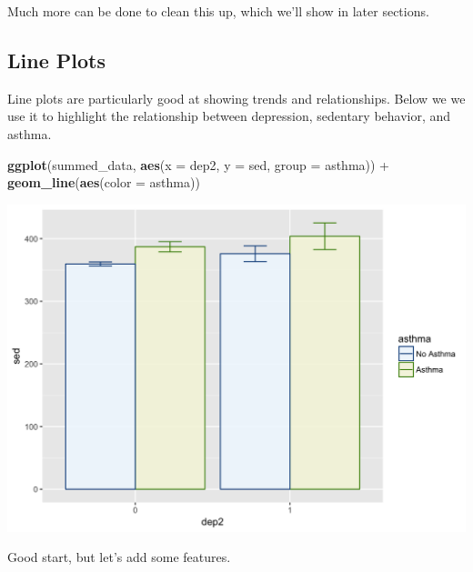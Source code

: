 \documentclass[]{tufte-book}
\newenvironment{Shaded}{}{}
\newcommand{\KeywordTok}[1]{\textcolor[rgb]{0.00,0.44,0.13}{\textbf{#1}}}
\newcommand{\DataTypeTok}[1]{\textcolor[rgb]{0.56,0.13,0.00}{#1}}
\newcommand{\StringTok}[1]{\textcolor[rgb]{0.25,0.44,0.63}{#1}}
\newcommand{\OperatorTok}[1]{\textcolor[rgb]{0.40,0.40,0.40}{#1}}
\newcommand{\NormalTok}[1]{#1}
\theoremstyle{definition}
\theoremstyle{definition}
\theoremstyle{remark}
\begin{document}
Much more can be done to clean this up, which we'll show in later
sections.

\subsection*{Line Plots}\label{line-plots}

Line plots are particularly good at showing trends and relationships.
Below we we use it to highlight the relationship between depression,
sedentary behavior, and asthma.

\begin{Shaded}
\begin{Highlighting}[]
\KeywordTok{ggplot}\NormalTok{(summed_data, }\KeywordTok{aes}\NormalTok{(}\DataTypeTok{x =}\NormalTok{ dep2, }\DataTypeTok{y =}\NormalTok{ sed, }\DataTypeTok{group =}\NormalTok{ asthma)) }\OperatorTok{+}\StringTok{ }
\StringTok{    }\KeywordTok{geom_line}\NormalTok{(}\KeywordTok{aes}\NormalTok{(}\DataTypeTok{color =}\NormalTok{ asthma))}
\end{Highlighting}
\end{Shaded}

\includegraphics{_main_files/figure-latex/unnamed-chunk-145-1}

Good start, but let's add some features.
\end{document}
